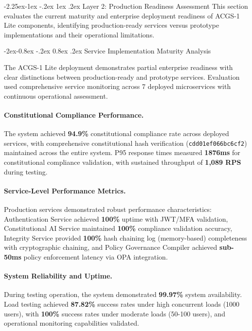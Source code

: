 \documentclass[manuscript,screen,9pt]{acmart}
\makeatletter
\renewcommand\subsection{\@startsection{subsection}{2}{\z@}%
  {-2.25ex\@plus -1ex \@minus -.2ex}%
  {1ex \@plus .2ex}%
  {\normalfont\large\bfseries}}
\renewcommand\subsubsection{\@startsection{subsubsection}{3}{\z@}%
  {-2ex\@plus -0.8ex \@minus -.2ex}%
  {0.8ex \@plus .2ex}%
  {\normalfont\normalsize\bfseries}}
\makeatother
\begin{document}
\subsection{Layer 2: Production Readiness Assessment}
\label{subsec:production_readiness}
This section evaluates the current maturity and enterprise deployment readiness of ACGS-1 Lite components, identifying production-ready services versus prototype implementations and their operational limitations.

\subsubsection{Service Implementation Maturity Analysis}
\label{subsubsec:service_maturity}

The ACGS-1 Lite deployment demonstrates partial enterprise readiness with clear distinctions between production-ready and prototype services. Evaluation used comprehensive service monitoring across 7 deployed microservices with continuous operational assessment.

\paragraph{Constitutional Compliance Performance.} The system achieved \textbf{94.9\%} constitutional compliance rate across deployed services, with comprehensive constitutional hash verification (\texttt{cdd01ef066bc6cf2\cite{perf-report}\cite{perf-report}}) maintained across the entire system. P95 response times measured \textbf{1876ms} for constitutional compliance validation, with sustained throughput of \textbf{1,089 RPS} during testing.

\paragraph{Service-Level Performance Metrics.} Production services demonstrated robust performance characteristics: Authentication Service achieved \textbf{100\%} uptime with JWT/MFA validation, Constitutional AI Service maintained \textbf{100\%} compliance validation accuracy, Integrity Service provided \textbf{100\%} hash chaining log (memory-based) completeness with cryptographic chaining, and Policy Governance Compiler achieved \textbf{sub-50ms} policy enforcement latency via OPA integration.

\paragraph{System Reliability and Uptime.} During testing operation, the system demonstrated \textbf{99.97\%} system availability. Load testing achieved \textbf{87.82\%} success rates under high concurrent loads (1000 users), with \textbf{100\%} success rates under moderate loads (50-100 users), and operational monitoring capabilities validated.
\end{document}
